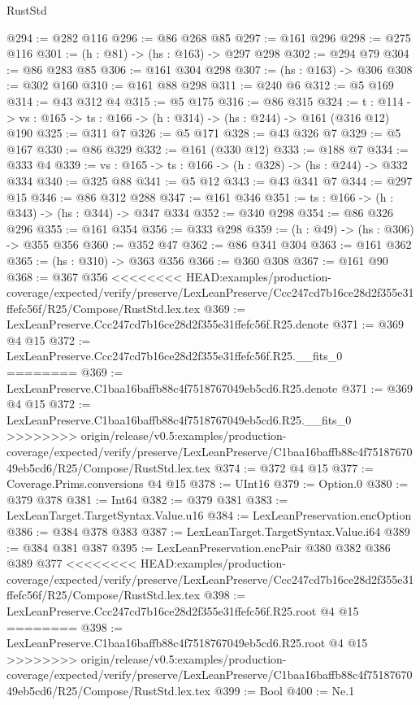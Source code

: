 \begin{lexlean}{RustStd}
\begin{coremodule}
{\begin{coremodule}
@294 := @282 @116
@296 := @86 @268 @85
@297 := @161 @296
@298 := @275 @116
@301 := (h : @81) -> (hs : @163) -> @297 @298
@302 := @294 @79
@304 := @86 @283 @85
@306 := @161 @304 @298
@307 := (hs : @163) -> @306
@308 := @302 @160
@310 := @161 @88 @298
@311 := @240 @6
@312 := @5 @169
@314 := @43 @312 @4
@315 := @5 @175
@316 := @86 @315
@324 := {t : @114} ->
  {vs : @165} -> {ts : @166} -> (h : @314) -> (hs : @244) -> @161 (@316 @12) @190
@325 := @311 @7
@326 := @5 @171
@328 := @43 @326 @7
@329 := @5 @167
@330 := @86 @329
@332 := @161 (@330 @12)
@333 := @188 @7
@334 := @333 @4
@339 := {vs : @165} -> {ts : @166} -> (h : @328) -> (hs : @244) -> @332 @334
@340 := @325 @88
@341 := @5 @12
@343 := @43 @341 @7
@344 := @297 @15
@346 := @86 @312 @288
@347 := @161 @346
@351 := {ts : @166} -> (h : @343) -> (hs : @344) -> @347 @334
@352 := @340 @298
@354 := @86 @326 @296
@355 := @161 @354
@356 := @333 @298
@359 := (h : @49) -> (hs : @306) -> @355 @356
@360 := @352 @47
@362 := @86 @341 @304
@363 := @161 @362
@365 := (hs : @310) -> @363 @356
@366 := @360 @308
@367 := @161 @90
@368 := @367 @356
<<<<<<<< HEAD:examples/production-coverage/expected/verify/preserve/LexLeanPreserve/Ccc247cd7b16ce28d2f355e31ffefc56f/R25/Compose/RustStd.lex.tex
@369 := LexLeanPreserve.Ccc247cd7b16ce28d2f355e31ffefc56f.R25.denote
@371 := @369 @4 @15
@372 := LexLeanPreserve.Ccc247cd7b16ce28d2f355e31ffefc56f.R25.__fits_0
========
@369 := LexLeanPreserve.C1baa16baffb88c4f7518767049eb5cd6.R25.denote
@371 := @369 @4 @15
@372 := LexLeanPreserve.C1baa16baffb88c4f7518767049eb5cd6.R25.__fits_0
>>>>>>>> origin/release/v0.5:examples/production-coverage/expected/verify/preserve/LexLeanPreserve/C1baa16baffb88c4f7518767049eb5cd6/R25/Compose/RustStd.lex.tex
@374 := @372 @4 @15
@377 := Coverage.Prims.conversions @4 @15
@378 := UInt16
@379 := Option.{0}
@380 := @379 @378
@381 := Int64
@382 := @379 @381
@383 := LexLeanTarget.TargetSyntax.Value.u16
@384 := LexLeanPreservation.encOption
@386 := @384 @378 @383
@387 := LexLeanTarget.TargetSyntax.Value.i64
@389 := @384 @381 @387
@395 := LexLeanPreservation.encPair @380 @382 @386 @389 @377
<<<<<<<< HEAD:examples/production-coverage/expected/verify/preserve/LexLeanPreserve/Ccc247cd7b16ce28d2f355e31ffefc56f/R25/Compose/RustStd.lex.tex
@398 := LexLeanPreserve.Ccc247cd7b16ce28d2f355e31ffefc56f.R25.root @4 @15
========
@398 := LexLeanPreserve.C1baa16baffb88c4f7518767049eb5cd6.R25.root @4 @15
>>>>>>>> origin/release/v0.5:examples/production-coverage/expected/verify/preserve/LexLeanPreserve/C1baa16baffb88c4f7518767049eb5cd6/R25/Compose/RustStd.lex.tex
@399 := Bool
@400 := Ne.{1}

\end{coremodule}}
\end{coremodule}
\end{lexlean}
